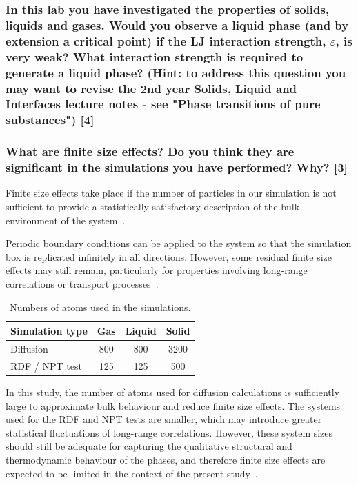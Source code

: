 \documentclass[a4paper,10pt,twocolumn]{article}
\begin{document}
\subsubsection*{In this lab you have investigated the properties of solids, liquids and gases. Would you observe a liquid phase (and by extension a critical point) if the LJ interaction strength, $\varepsilon$, is very weak? What interaction strength is required to generate a liquid phase? (Hint: to address this question you may want to revise the 2nd year Solids, Liquid and Interfaces lecture notes - see "Phase transitions of pure substances") [4]}

\subsubsection*{What are finite size effects? Do you think they are significant in the simulations you have performed? Why? [3]}

Finite size effects take place if the number of particles in our simulation is not sufficient to provide a statistically satisfactory description of the bulk environment of the system~\cite{reible2023finite}. 

Periodic boundary conditions can be applied to the system so that the simulation box is replicated infinitely in all directions. However, some residual finite size effects may still remain, particularly for properties involving long-range correlations or transport processes~\cite{allen2017computer}.

\begin{table}[H]
\centering
\caption{Numbers of atoms used in the simulations.}
\label{tab:atom_numbers}
\begin{tabular}{lccc}
\toprule
Simulation type & Gas & Liquid & Solid \\
\midrule
Diffusion & 800 & 800 & 3200 \\
RDF / NPT test & 125 & 125 & 500 \\
\bottomrule
\end{tabular}
\end{table}

In this study, the number of atoms used for diffusion calculations is sufficiently large to approximate bulk behaviour and reduce finite size effects. The systems used for the RDF and NPT tests are smaller, which may introduce greater statistical fluctuations of long-range correlations. However, these system sizes should still be adequate for capturing the qualitative structural and thermodynamic behaviour of the phases, and therefore finite size effects are expected to be limited in the context of the present study~\cite{frenkel2023understanding}.
\end{document}
